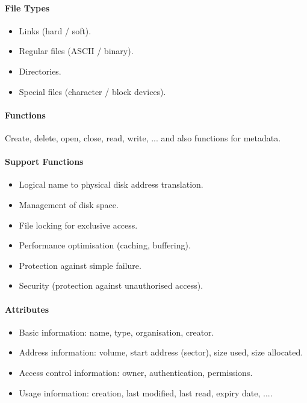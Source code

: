 \documentclass[twocolumn,english]{article}
\begin{document}
\paragraph{File Types}
\begin{itemize}
\item Links (hard / soft).
\item Regular files (ASCII / binary).
\item Directories.
\item Special files (character / block devices).
\end{itemize}

\paragraph{Functions}

Create, delete, open, close, read, write, ... and also functions for
metadata.

\paragraph{Support Functions}
\begin{itemize}
\item Logical name to physical disk address translation.
\item Management of disk space.
\item File locking for exclusive access.
\item Performance optimisation (caching, buffering).
\item Protection against simple failure.
\item Security (protection against unauthorised access).
\end{itemize}

\paragraph{Attributes}
\begin{itemize}
\item Basic information: name, type, organisation, creator.
\item Address information: volume, start address (sector), size used, size
allocated.
\item Access control information: owner, authentication, permissions.
\item Usage information: creation, last modified, last read, expiry date,
....
\end{itemize}
\end{document}

